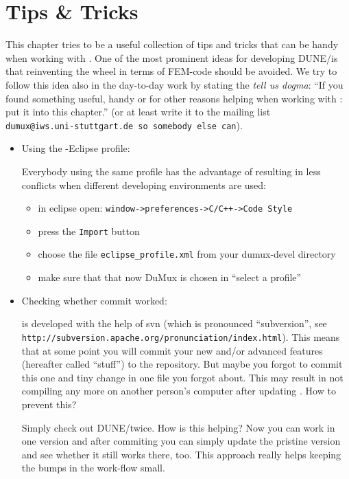 \chapter{Tips \& Tricks}
This chapter tries to be a useful collection of tips and tricks that can be handy when working with 
\Dumux. One of the most prominent ideas for developing DUNE/\Dumux is that reinventing the wheel in terms of FEM-code should
be avoided.  We try to follow this idea also in the day-to-day work by stating the \emph{tell us dogma}: ``If you found something useful, 
handy or for other reasons helping when working with \Dumux: put it into this chapter.'' (or at least write it to the mailing list \\ \verb+dumux@iws.uni-stuttgart.de so somebody else can+). 
\begin{itemize}
 \item Using the \Dumux-Eclipse profile:

Everybody using the same profile has the advantage of  resulting in less conflicts when different developing environments are used:
\begin{itemize}
 \item in eclipse open: \verb#window->preferences->C/C++->Code Style#
  \item press the \verb+Import+ button
  \item choose the file \verb+eclipse_profile.xml+ from your dumux-devel directory
  \item make sure that that now DuMux is chosen in ``select a profile''
\end{itemize}

\item Checking whether commit worked:

\Dumux is developed with the help of svn (which is pronounced ``subversion'', see \\\verb+http://subversion.apache.org/pronunciation/index.html+). This means that at some point you will commit your new 
and/or advanced features (hereafter called ``stuff'') to the repository. But maybe you forgot to commit this one and tiny change in one file you forgot about. 
This may result in \Dumux not compiling any more on another person's computer after updating . How to prevent this?

Simply check out DUNE/\Dumux twice. How is this helping? Now you can work in one version and after commiting you can simply update the pristine version and see whether it still works there, too. 
This approach really helps keeping the bumps in the work-flow small.


\end{itemize}
